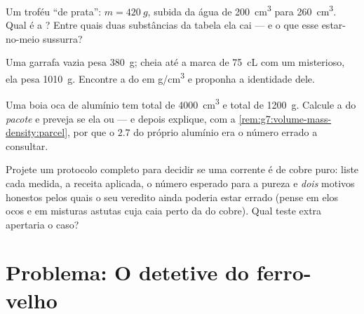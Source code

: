 \begin{exercise}[$\star\star$]\label{exo:g7:volume-mass-density:9}
Um troféu ``de prata'': $m = \qty{420}{g}$, subida da água de
\qty{200}{cm^3} para \qty{260}{cm^3}. Qual é a ? Entre quais
duas substâncias da tabela ela cai --- e o que esse estar-no-meio
sussurra?
\end{exercise}

\begin{exercise}[$\star\star$]\label{exo:g7:volume-mass-density:10}
Uma garrafa vazia pesa \qty{380}{g}; cheia até a marca de
\qty{75}{cL} com um  misterioso, ela pesa \qty{1010}{g}.
Encontre a  do  em \unit{g/cm^3} e proponha a
identidade dele.
\end{exercise}

\begin{exercise}[$\star\star$]\label{exo:g7:volume-mass-density:11}
Uma boia oca de alumínio tem  total de \qty{4000}{cm^3} e 
total de \qty{1200}{g}. Calcule a  do \emph{pacote} e
preveja se ela  ou  --- e depois explique, com a
\cref{rem:g7:volume-mass-density:parcel}, por que o $2.7$ do próprio
alumínio era o número errado a consultar.
\end{exercise}

\begin{exercise}[$\star\star\star$]\label{exo:g7:volume-mass-density:12}
Projete um protocolo completo para decidir se uma corrente é de cobre
puro: liste cada medida, a receita aplicada, o número esperado para a
pureza e \emph{dois} motivos honestos pelos quais o seu veredito
ainda poderia estar errado (pense em elos ocos e em misturas astutas
cuja  caia perto da do cobre). Qual teste extra apertaria o
caso?
\end{exercise}

\section{Problema: O detetive do ferro-velho}

